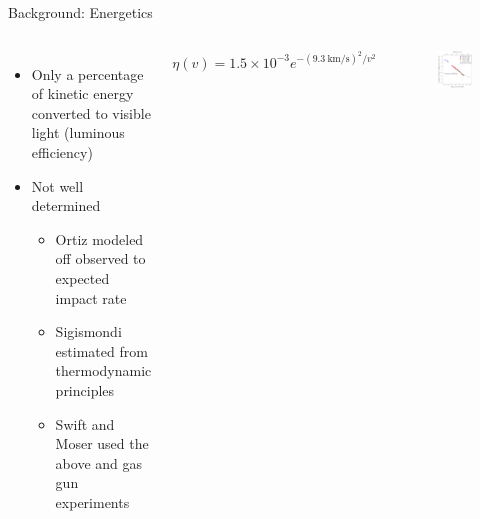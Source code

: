 \documentclass[pdf]{beamer}
\begin{document}
\begin{frame}{Background: Energetics}
  \begin{columns}
	\begin{itemize}
	  \item Only a percentage of kinetic energy converted to visible light (luminous efficiency)
	  \item Not well determined
		\begin{itemize}
		  \item Ortiz modeled off observed to expected impact rate \citep{Ortiz2002}
		  \item Sigismondi estimated from thermodynamic principles \citep{Sigismondi2001}
		  \item Swift and Moser used the above and gas gun experiments \citep{Swift2011}
		\end{itemize}
	\end{itemize}
	\[\eta(v) = 1.5\times 10^{-3} e^{-(\SI{9.3}{\kilo\meter\per\second})^2/v^2}\]
	\begin{figure}[h!]
	  \centering
	  \includegraphics[width=\textwidth]{Images/Cumulative-Flux-2-Date_V2.pdf}
	\end{figure}
  \end{columns}
\end{frame}
\end{document}
